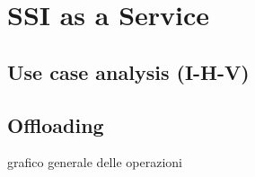 
\section{SSI as a Service}
\subsection{Use case analysis (I-H-V)}

\subsection{Offloading}
grafico generale delle operazioni

